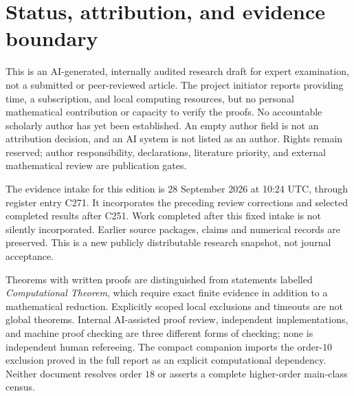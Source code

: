 \section*{Status, attribution, and evidence boundary}
This is an AI-generated, internally audited research draft for expert
examination, not a submitted or peer-reviewed article. The project initiator
reports providing time, a subscription, and local computing resources, but
no personal mathematical contribution or capacity to verify the proofs.
No accountable scholarly author has yet been established. An empty author
field is not an attribution decision, and an AI system is not listed as an
author. Rights remain reserved; author responsibility, declarations,
literature priority, and external mathematical review are publication gates.

The evidence intake for this edition is 28 September 2026 at 10:24 UTC,
through register entry C271. It incorporates the preceding review
corrections and selected completed results after C251. Work completed
after this fixed intake is not silently incorporated. Earlier source
packages, claims and numerical records are preserved. This is a new
publicly distributable research snapshot, not journal acceptance.

Theorems with written proofs are distinguished from statements labelled
\emph{Computational Theorem}, which require exact finite evidence in
addition to a mathematical reduction. Explicitly scoped local exclusions
and timeouts are not global theorems. Internal AI-assisted proof review,
independent implementations, and machine proof checking are three different
forms of checking; none is independent human refereeing. The compact
companion imports the order-$10$ exclusion proved in the full report as an
explicit computational dependency. Neither document resolves order $18$ or
asserts a complete higher-order main-class census.
